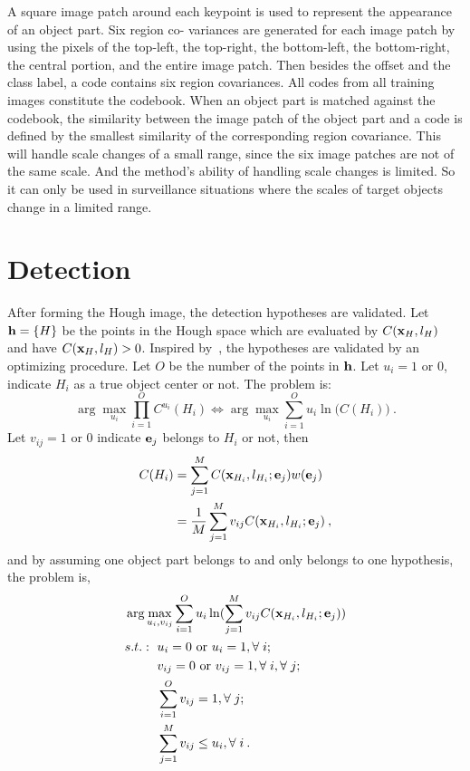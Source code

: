 A square image patch around each keypoint is used to
represent the appearance of an object part. Six region co-
variances are generated for each image patch by using the
pixels of the top-left, the top-right, the bottom-left, the
bottom-right, the central portion, and the entire image patch. Then
besides the offset and the class label, a code contains six
region covariances.   All codes from all training images constitute the codebook. When an object part is matched against
the codebook, the similarity between the image patch of the
object part and a code is defined by the smallest similarity
of the corresponding region covariance. This will handle scale changes of a small range, since the six image patches are not of the same scale. And the method's ability of handling scale changes is limited. So it can only be used in surveillance situations where the scales of target objects change in a limited range.

\section{Detection}
\label{det4}
After forming the Hough image, the detection hypotheses are validated. Let ${\bf{h}}=\{ H \}$ be the points in the Hough space which are evaluated by $C({\bf{x}}_{H},l_{H})$ and have $C({\bf{x}}_{H},l_{H})>0$.  Inspired by~\citep{ac9}, the hypotheses are validated by an optimizing procedure. Let $O$ be the number of the points in ${\bf{h}}$.  Let $u_i=1\mbox{ or } 0$, indicate $H_i$ as a true object center or not. The problem is:
\[
\arg \max\limits_{u_i} \prod\limits_{i = 1}^O { C^{u_i}({H_i})} \Longleftrightarrow\arg \max\limits_{u_i} \sum\limits_{i = 1}^O {{u_i}\ln (C({H_i})} )\:.
\]
Let $v_{ij}=1\mbox{ or } 0$ indicate ${\bf{e}}_j$ belongs to $H_i$ or not, then
\[
\begin{aligned}
C(H_i)&=\sum\limits^M_{j=1} C({\bf{x}}_{H_i},l_{H_i};{\bf{e}}_j)w({\bf{e}}_j)\\
&=\frac 1 M \sum\limits^M_{j=1} v_{ij} C({\bf{x}}_{H_i},l_{H_i};{\bf{e}}_j)\:,
\end{aligned}
\]
and by assuming one object part belongs to and only belongs to one hypothesis, the problem is,
\[
\begin{aligned}
&\arg \max\limits_{u_i,v_{ij}} \sum\limits_{i = 1}^O {{u_i}\ln (\sum\limits^M_{j=1} v_{ij} C({\bf{x}}_{H_i},l_{H_i};{\bf{e}}_j)} )\\
&
\begin{aligned}
    s.t.:\mbox{ }&u_i=0\mbox{ or }u_i=1,\forall\;i;\\
    &v_{ij}=0\mbox{ or }v_{ij}=1,\forall\;i,\forall\;j;\\
    &\sum\limits_{i = 1}^O {v_{ij}}=1,\forall\;j;\;\;  \\
    &\sum\limits_{j = 1}^M {v_{ij}}\leq u_i,\forall\;i\:.
\end{aligned}
\end{aligned}
\]


